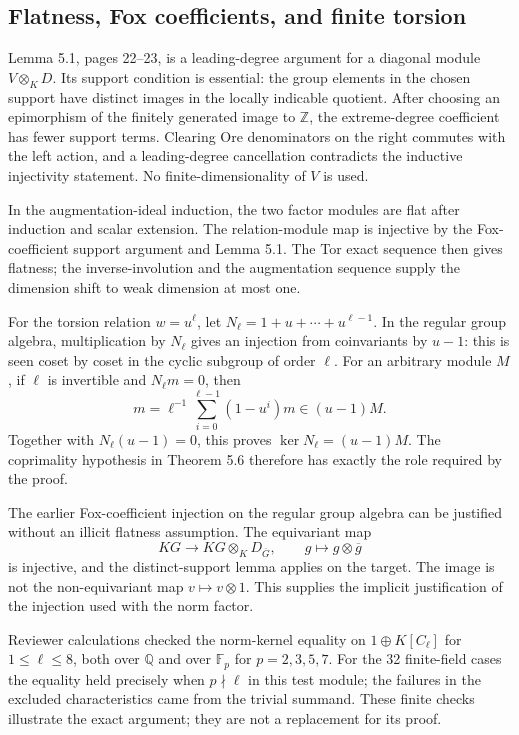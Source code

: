 \documentclass[10pt]{article}
\begin{document}
\subsection*{Flatness, Fox coefficients, and finite torsion}
Lemma 5.1, pages 22–23, is a leading-degree argument for a diagonal module \(V\otimes_KD\). Its support condition is essential: the group elements in the chosen support have distinct images in the locally indicable quotient. After choosing an epimorphism of the finitely generated image to \(\mathbb Z\), the extreme-degree coefficient has fewer support terms. Clearing Ore denominators on the right commutes with the left action, and a leading-degree cancellation contradicts the inductive injectivity statement. No finite-dimensionality of \(V\) is used.\par
In the augmentation-ideal induction, the two factor modules are flat after induction and scalar extension. The relation-module map is injective by the Fox-coefficient support argument and Lemma 5.1. The Tor exact sequence then gives flatness; the inverse-involution and the augmentation sequence supply the dimension shift to weak dimension at most one.\par
For the torsion relation \(w=u^\ell\), let \(N_\ell=1+u+\cdots+u^{\ell-1}\). In the regular group algebra, multiplication by \(N_\ell\) gives an injection from coinvariants by \(u-1\): this is seen coset by coset in the cyclic subgroup of order \(\ell\). For an arbitrary module \(M\), if \(\ell\) is invertible and \(N_\ell m=0\), then \[m=\ell^{-1}\sum_{i=0}^{\ell-1}(1-u^i)m\in (u-1)M.\] Together with \(N_\ell(u-1)=0\), this proves \(\ker N_\ell=(u-1)M\). The coprimality hypothesis in Theorem 5.6 therefore has exactly the role required by the proof.\par
The earlier Fox-coefficient injection on the regular group algebra can be justified without an illicit flatness assumption. The equivariant map \[KG\longrightarrow KG\otimes_KD_{\overline G},\qquad
 g\longmapsto g\otimes\overline g\] is injective, and the distinct-support lemma applies on the target. The image is not the non-equivariant map \(v\mapsto v\otimes1\). This supplies the implicit justification of the injection used with the norm factor.\par
Reviewer calculations checked the norm-kernel equality on \(1\oplus K[C_\ell]\) for \(1\le\ell\le8\), both over \(\mathbb Q\) and over \(\mathbb F_p\) for \(p=2,3,5,7\). For the 32 finite-field cases the equality held precisely when \(p\nmid\ell\) in this test module; the failures in the excluded characteristics came from the trivial summand. These finite checks illustrate the exact argument; they are not a replacement for its proof.\par
\end{document}
